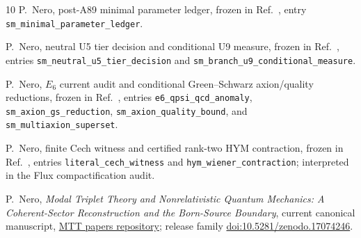 \documentclass[11pt]{article}
\begin{document}
\begin{thebibliography}{10}
P.~Nero, post-A89 minimal parameter ledger, frozen in Ref.~\cite{MTTResults}, entry
\nolinkurl{sm_minimal_parameter_ledger}.

P.~Nero, neutral U5 tier decision and conditional U9 measure, frozen in
Ref.~\cite{MTTResults}, entries \nolinkurl{sm_neutral_u5_tier_decision} and
\nolinkurl{sm_branch_u9_conditional_measure}.

P.~Nero, $E_6$ current audit and conditional Green--Schwarz axion/quality reductions,
frozen in Ref.~\cite{MTTResults}, entries \nolinkurl{e6_qpsi_qcd_anomaly},
\nolinkurl{sm_axion_gs_reduction}, \nolinkurl{sm_axion_quality_bound}, and
\nolinkurl{sm_multiaxion_superset}.

P.~Nero, finite Cech witness and certified rank-two HYM contraction, frozen in
Ref.~\cite{MTTResults}, entries \nolinkurl{literal_cech_witness} and
\nolinkurl{hym_wiener_contraction}; interpreted in the Flux compactification audit.

P.~Nero, \emph{Modal Triplet Theory and Nonrelativistic Quantum Mechanics:
A Coherent-Sector Reconstruction and the Born-Source Boundary},
current canonical manuscript, \href{https://github.com/PeterNero/mtt-papers/tree/main/papers/modal-triplet-theory-from-mtt-to-quantum-mechanics}{MTT papers repository};
release family \href{https://doi.org/10.5281/zenodo.17074246}{doi:10.5281/zenodo.17074246}.

\end{thebibliography}
\end{document}
